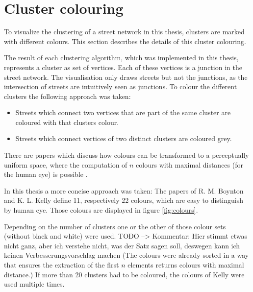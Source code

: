 \documentclass[11pt, a4paper]{report}
\begin{document}
\section{Cluster colouring}
To visualize the clustering of a street network in this thesis, clusters are marked with different colours. This section describes the details of this cluster colouring.

The result of each clustering algorithm, which was implemented in this thesis, represents a cluster as set of vertices. Each of these vertices is a junction in the street network. The visualisation only draws streets but not the junctions, as the intersection of streets are intuitively seen as junctions. To colour the different clusters the following approach was taken:

\begin{itemize}
    \item Streets which connect two vertices that are part of the same cluster are coloured with that clusters colour.
    \item Streets which connect vertices of two distinct clusters are coloured grey.
\end{itemize}

There are papers which discuss how colours can be transformed to a perceptually uniform space, where the computation of $n$ colours with maximal distances (for the human eye) is possible \cite{colors:2006}.

In this thesis a more concise approach was taken: The papers of R. M. Boynton \cite{boynton:1989} and K. L. Kelly \cite{kelly:1965} define 11, respectively 22 colours, which are easy to distinguish by human eye. Those colours are displayed in figure \ref{fig:colours}.

Depending on the number of clusters one or the other of those colour sets (without black and white) were used. TODO --> Kommentar: Hier stimmt etwas nicht ganz, aber ich verstehe nicht, was der Satz sagen soll, deswegen kann ich keinen Verbesserungsvorschlag machen (The colours were already sorted in a way that ensures the extraction of the first $n$ elements returns colours with maximal distance.) If more than 20 clusters had to be coloured, the colours of Kelly were used multiple times.
\end{document}
